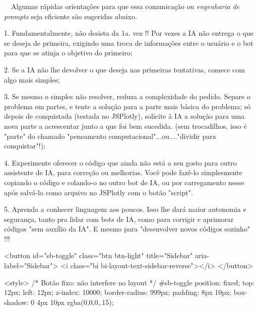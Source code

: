 \documentclass[
  portuguese,
  letterpaper,
  DIV=11,
  numbers=noendperiod]{scrreprt}
\newenvironment{Shaded}{\begin{snugshade}}{\end{snugshade}}
\newcommand{\DecValTok}[1]{\textcolor[rgb]{0.68,0.00,0.00}{#1}}
\newcommand{\FloatTok}[1]{\textcolor[rgb]{0.68,0.00,0.00}{#1}}
\newcommand{\FunctionTok}[1]{\textcolor[rgb]{0.28,0.35,0.67}{#1}}
\newcommand{\NormalTok}[1]{\textcolor[rgb]{0.00,0.23,0.31}{#1}}
\newcommand{\SpecialCharTok}[1]{\textcolor[rgb]{0.37,0.37,0.37}{#1}}
\newcommand{\StringTok}[1]{\textcolor[rgb]{0.13,0.47,0.30}{#1}}
\begin{document}
~~Algumas rápidas orientações para que essa comunicação ou
\emph{engenharia de prompts} seja eficiente são sugeridas abaixo.

\begin{Shaded}
\begin{Highlighting}[]
\FloatTok{1.}\NormalTok{ Fundamentalmente, não desista da }\DecValTok{1}\NormalTok{a. vez }\SpecialCharTok{!!}\NormalTok{ Por vezes a IA não entrega o que se deseja de primeira, exigindo uma troca de informações entre o usuário e o bot para que se atinja o objetivo do primeiro;}

\FloatTok{2.}\NormalTok{ Se a IA não lhe devolver o que deseja nas primeiras tentativas, comece com algo mais simples;}

\FloatTok{3.}\NormalTok{ Se mesmo o simples não resolver, reduza a complexidade do pedido. Separe o problema em partes, e tente a solução para a parte mais básica do problema; só depois de }\FunctionTok{conquistada}\NormalTok{ (testada no JSPlotly), solicite à IA a solução para uma nova parte a acrescentar junto a que foi bem }\FunctionTok{sucedida.}\NormalTok{ (sem trocadilhos, isso é }\StringTok{"parte"}\NormalTok{ do chamado }\StringTok{"pensamento computacional"}\NormalTok{...ou....}\StringTok{"dividir para conquistar"}\SpecialCharTok{!}\NormalTok{);}

\FloatTok{4.}\NormalTok{ Experimente oferecer o código que ainda não está a seu gosto para outro assistente de IA, para correção ou melhorias. Você pode fazê}\SpecialCharTok{{-}}\NormalTok{lo simplesmente copiando o código e colando}\SpecialCharTok{{-}}\NormalTok{o no outro bot de IA, ou por carregamento nesse após salvá}\SpecialCharTok{{-}}\NormalTok{lo como arquivo no JSPlotly com o botão }\StringTok{"script"}\NormalTok{.}

\FloatTok{5.}\NormalTok{ Aprenda a conhecer linguagem aos poucos. Isso lhe dará maior autonomia e segurança, tanto pra lidar com bots de IA, como para corrigir e aprimorar códigos }\StringTok{"sem auxílio da IA"}\NormalTok{. E mesmo para }\StringTok{"desenvolver novos códigos sozinho"} \SpecialCharTok{!!!}
\end{Highlighting}
\end{Shaded}




<button id="sb-toggle" class="btn btn-light" title="Sidebar" aria-label="Sidebar">
  <i class="bi bi-layout-text-sidebar-reverse"></i>
</button>

<style>
  /* Botão fixo: não interfere no layout */
  #sb-toggle{
    position: fixed; top: 12px; left: 12px; z-index: 10000;
    border-radius: 999px; padding: 8px 10px; box-shadow: 0 4px 10px rgba(0,0,0,.15);
  }
\end{document}
